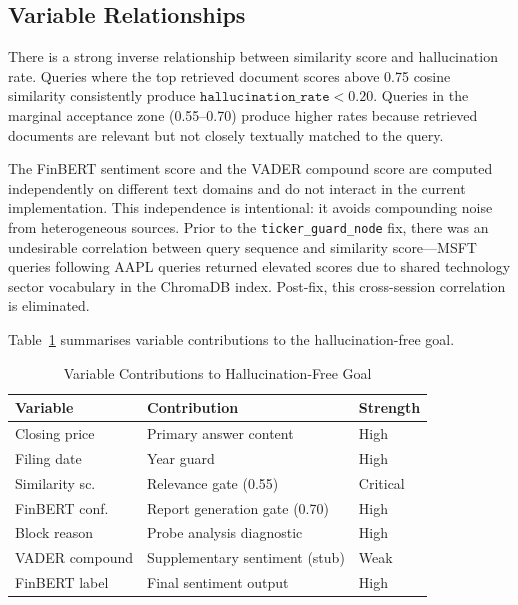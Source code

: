 \documentclass[10pt,twocolumn]{article}
\newcommand{\node}[1]{\texttt{#1}}
\begin{document}
\subsection{Variable Relationships}

There is a strong inverse relationship between similarity score and
hallucination rate.
Queries where the top retrieved document scores above 0.75 cosine
similarity consistently produce $\texttt{hallucination\_rate} < 0.20$.
Queries in the marginal acceptance zone (0.55--0.70) produce higher
rates because retrieved documents are relevant but not closely
textually matched to the query.

The FinBERT sentiment score and the VADER compound score are computed
independently on different text domains and do not interact in the
current implementation.
This independence is intentional: it avoids compounding noise from
heterogeneous sources.
Prior to the \node{ticker\_guard\_node} fix, there was an undesirable
correlation between query sequence and similarity score---MSFT queries
following AAPL queries returned elevated scores due to shared
technology sector vocabulary in the ChromaDB index.
Post-fix, this cross-session correlation is eliminated.

Table~\ref{tab:contributions} summarises variable contributions to
the hallucination-free goal.

\begin{table}[htbp]
\caption{Variable Contributions to Hallucination-Free Goal}
\label{tab:contributions}
\centering
\small
\begin{tabular}{@{}lll@{}}
\toprule
\textbf{Variable} & \textbf{Contribution} & \textbf{Strength} \\
\midrule
Closing price  & Primary answer content         & High \\
Filing date    & Year guard                     & High \\
Similarity sc. & Relevance gate (0.55)          & Critical \\
FinBERT conf.  & Report generation gate (0.70)  & High \\
Block reason   & Probe analysis diagnostic      & High \\
VADER compound & Supplementary sentiment (stub) & Weak \\
FinBERT label  & Final sentiment output         & High \\
\bottomrule
\end{tabular}
\end{table}
\end{document}
